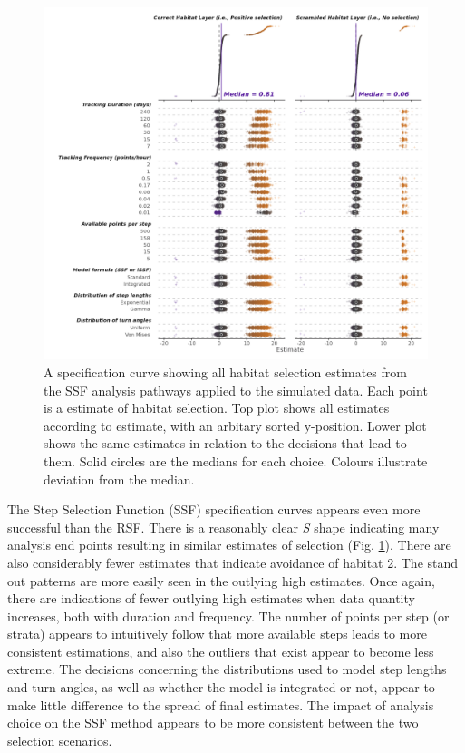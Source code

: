 \documentclass[10pt,a4paper]{article}
\begin{document}
\begin{figure}
\includegraphics[width=1\linewidth]{../figures/ssfSpecCurve} \caption{A specification curve showing all habitat selection estimates from the SSF analysis pathways applied to the simulated data. Each point is a estimate of habitat selection. Top plot shows all estimates according to estimate, with an arbitary sorted y-position. Lower plot shows the same estimates in relation to the decisions that lead to them. Solid circles are the medians for each choice. Colours illustrate deviation from the median.}\label{fig:specCurveSSF}
\end{figure}

The Step Selection Function (SSF) specification curves appears even more successful than the RSF.
There is a reasonably clear \emph{S} shape indicating many analysis end points resulting in similar estimates of selection (Fig. \ref{fig:specCurveSSF}).
There are also considerably fewer estimates that indicate avoidance of habitat 2.
The stand out patterns are more easily seen in the outlying high estimates.
Once again, there are indications of fewer outlying high estimates when data quantity increases, both with duration and frequency.
The number of points per step (or strata) appears to intuitively follow that more available steps leads to more consistent estimations, and also the outliers that exist appear to become less extreme.
The decisions concerning the distributions used to model step lengths and turn angles, as well as whether the model is integrated or not, appear to make little difference to the spread of final estimates.
The impact of analysis choice on the SSF method appears to be more consistent between the two selection scenarios.
\end{document}
